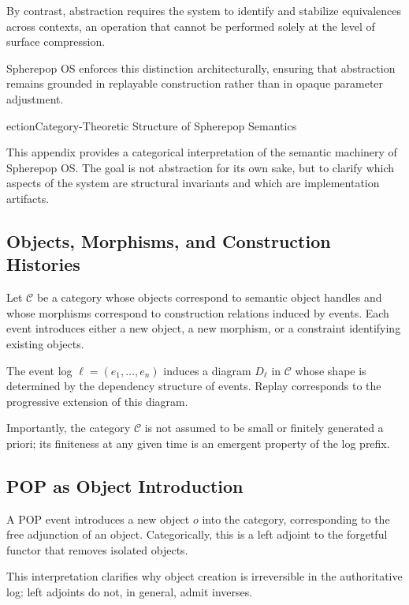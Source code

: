 \documentclass[11pt]{article}
\begin{document}
By contrast, abstraction requires the system to identify and stabilize
equivalences across contexts, an operation that cannot be performed solely
at the level of surface compression.

Spherepop OS enforces this distinction architecturally, ensuring that
abstraction remains grounded in replayable construction rather than in
opaque parameter adjustment.



ection{Category-Theoretic Structure of Spherepop Semantics}

This appendix provides a categorical interpretation of the semantic
machinery of Spherepop OS. The goal is not abstraction for its own sake,
but to clarify which aspects of the system are structural invariants and
which are implementation artifacts.

\subsection{Objects, Morphisms, and Construction Histories}

Let $\mathcal{C}$ be a category whose objects correspond to semantic object
handles and whose morphisms correspond to construction relations induced
by events. Each event introduces either a new object, a new morphism, or a
constraint identifying existing objects.

The event log $\ell = (e_1, \ldots, e_n)$ induces a diagram $D_\ell$ in
$\mathcal{C}$ whose shape is determined by the dependency structure of
events. Replay corresponds to the progressive extension of this diagram.

Importantly, the category $\mathcal{C}$ is not assumed to be small or
finitely generated a priori; its finiteness at any given time is an
emergent property of the log prefix.

\subsection{POP as Object Introduction}

A POP event introduces a new object $o$ into the category, corresponding to
the free adjunction of an object. Categorically, this is a left adjoint to
the forgetful functor that removes isolated objects.

This interpretation clarifies why object creation is irreversible in the
authoritative log: left adjoints do not, in general, admit inverses.
\end{document}
